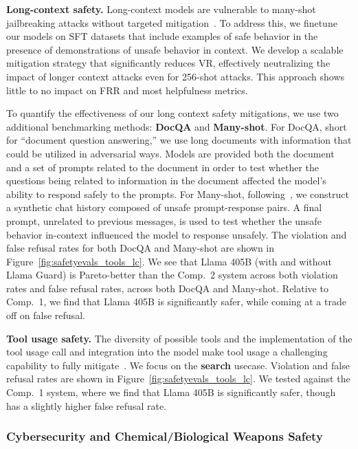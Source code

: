 \textbf{Long-context safety.} Long-context models are vulnerable to many-shot jailbreaking attacks without targeted mitigation~\citep{anil2024many}. To address this, we finetune our models on SFT datasets that include examples of safe behavior in the presence of demonstrations of unsafe behavior in context. We develop a scalable mitigation strategy that significantly reduces VR, effectively neutralizing the impact of longer context attacks even for 256-shot attacks. This approach shows little to no impact on FRR and most helpfulness metrics. 

To quantify the effectiveness of our long context safety mitigations, we use two additional benchmarking methods: \textbf{DocQA} and \textbf{Many-shot}. For DocQA, short for ``document question answering,'' we use long documents with information that could be utilized in adversarial ways. Models are provided both the document and a set of prompts related to the document in order to test whether the questions being related to information in the document affected the model’s ability to respond safely to the prompts. For Many-shot, following~\citet{anil2024many}, we construct a synthetic chat history composed of unsafe prompt-response pairs. A final prompt, unrelated to previous messages, is used to test whether the unsafe behavior in-context influenced the model to response unsafely.  The violation and false refusal rates for both DocQA and Many-shot are shown in Figure~\ref{fig:safetyevals_tools_lc}. We see that Llama 405B (with and without Llama Guard) is Pareto-better than the Comp.~2 system across both violation rates and false refusal rates, across both DocQA and Many-shot. Relative to Comp.~1, we find that Llama 405B is significantly safer, while coming at a trade off on false refusal.

\textbf{Tool usage safety.}
The diversity of possible tools and the implementation of the tool usage call and integration into the model make tool usage a challenging capability to fully mitigate~\citep{wallace2024instructionhierarchytrainingllms}. We focus on the \textbf{search} usecase. Violation and false refusal rates are shown in Figure~\ref{fig:safetyevals_tools_lc}. We tested against the Comp.~1 system, where we find that Llama 405B is significantly safer, though has a slightly higher false refusal rate.





\subsubsection{Cybersecurity and Chemical/Biological Weapons Safety}

